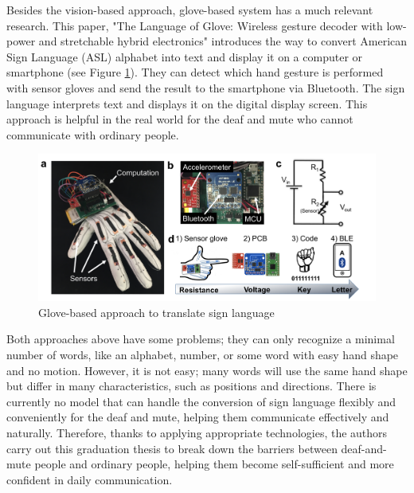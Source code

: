 Besides the vision-based approach, glove-based system has a much relevant research. This paper, "The Language of Glove: Wireless gesture decoder with low-power and stretchable hybrid electronics"\cite{o2017language} introduces the way to convert American Sign Language (ASL) alphabet into text and display it on a computer or smartphone (see Figure \ref{fig:Chap2-Glove-Base}). They can detect which hand gesture is performed with sensor gloves and send the result to the smartphone via Bluetooth. The sign language interprets text and displays it on the digital display screen. This approach is helpful in the real world for the deaf and mute who cannot communicate with ordinary people.

\begin{figure}[H]
  \centering
  \includegraphics[width=\textwidth]{img/Chap2/Glove-Based.png}
  \caption{Glove-based approach to translate sign language}
  \label{fig:Chap2-Glove-Base}
\end{figure}

Both approaches above have some problems; they can only recognize a minimal number of words, like an alphabet, number, or some word with easy hand shape and no motion. However, it is not easy; many words will use the same hand shape but differ in many characteristics, such as positions and directions. There is currently no model that can handle the conversion of sign language flexibly and conveniently for the deaf and mute, helping them communicate effectively and naturally. Therefore, thanks to applying appropriate technologies, the authors carry out this graduation thesis to break down the barriers between deaf-and-mute people and ordinary people, helping them become self-sufficient and more confident in daily communication.

